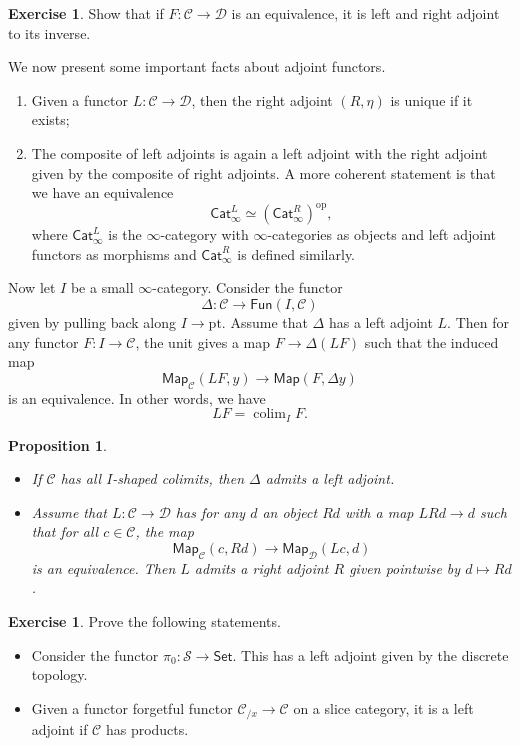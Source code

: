 \documentclass[10pt, oneside]{memoir}
\newtheorem{prop}[thm]{Proposition}
\theoremstyle{definition}
\newtheorem{exer}[thm]{Exercise}
\theoremstyle{remark}
\theoremstyle{plain}
\theoremstyle{definition}
\theoremstyle{remark}
\newcommand{\mc}[1]{\mathcal{#1}}
\newcommand{\mr}[1]{\mathrm{#1}}
\newcommand{\ms}[1]{\mathsf{#1}}
\newcommand{\1}{\mathbf{1}}
\newcommand{\2}{\mathbf{2}}
\newcommand{\3}{\mathbf{3}}
\DeclareMathOperator{\op}{op}
\DeclareMathOperator*{\colim}{colim}
\begin{document}
\begin{exer}
    Show that if $F \colon \mc{C} \to \mc{D}$ is an equivalence, it is left and right adjoint to its inverse.
\end{exer}

We now present some important facts about adjoint functors.
\begin{enumerate}
    \item Given a functor $L \colon \mc{C} \to \mc{D}$, then the right adjoint $(R, \eta)$ is unique if it exists;
    \item The composite of left adjoints is again a left adjoint with the right adjoint given by the composite of right adjoints. A more coherent statement is that we have an equivalence
    \[ \ms{Cat}_{\infty}^L \simeq (\ms{Cat}_{\infty}^R)^{\op}, \]
    where $\ms{Cat}_{\infty}^L$ is the $\infty$-category with $\infty$-categories as objects and left adjoint functors as morphisms and $\ms{Cat}_{\infty}^R$ is defined similarly.
\end{enumerate}

Now let $I$ be a small $\infty$-category. Consider the functor
\[ \Delta \colon \mc{C} \to \ms{Fun}(I, \mc{C}) \]
given by pulling back along $I \to \mr{pt}$. Assume that $\Delta$ has a left adjoint $L$. Then for any functor $F \colon I \to \mc{C}$, the unit gives a map $F \to \Delta(LF)$
such that the induced map
\[ \ms{Map}_{\mc{C}}(LF, y) \to \ms{Map}(F, \Delta y) \]
is an equivalence. In other words, we have
\[ LF = \colim_I F. \]

\begin{prop}\leavevmode
    \begin{itemize}
        \item If $\mc{C}$ has all $I$-shaped colimits, then $\Delta$ admits a left adjoint. 
        \item Assume that $L \colon \mc{C} \to \mc{D}$ has for any $d$ an object $Rd$ with a map $LRd \to d$ such that for all $c \in \mc{C}$, the map
        \[ \ms{Map}_{\mc{C}}(c, Rd) \to \ms{Map}_{\mc{D}}(Lc, d) \]
        is an equivalence. Then $L$ admits a right adjoint $R$ given pointwise by $d \mapsto Rd$.
    \end{itemize}
\end{prop}

\begin{exer}
    Prove the following statements.
    \begin{itemize}
        \item Consider the functor $\pi_0 \colon \mc{S} \to \ms{Set}$. This has a left adjoint given by the discrete topology.
        \item Given a functor forgetful functor $\mc{C}_{/x} \to \mc{C}$ on a slice category, it is a left adjoint if $\mc{C}$ has products.
    \end{itemize}
\end{exer}
\end{document}
